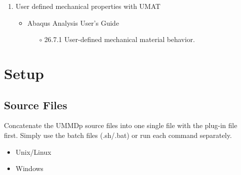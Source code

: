 \documentclass[11pt,a4paper,twoside,final,onecolumn,titlepage]{article}
\begin{document}
\begin{enumerate}
\begin{itemize}
\begin{itemize}
     	\end{itemize}
  	\end{itemize}
  	 \item User defined mechanical properties with UMAT
  	 \begin{itemize}
    	 \item Abaqus Analysis User's Guide
     	\begin{itemize}
     		\item[$\circ$] 26.7.1 User-defined mechanical material behavior.
     	\end{itemize}
  	\end{itemize}
\end{enumerate}

\newpage
\section{Setup}
\vspace{0.5cm}

\subsection{Source Files}
\vspace{0.2cm}

Concatenate the UMMDp source files into one single file with the plug-in file first. Simply use the batch files (.sh/.bat) or run each command separately.

\begin{itemize}
	\item Unix/Linux\\
	\par
	\texttt{}
\end{itemize}
\par\medskip
\begin{itemize}
	\item Windows\\
	\par
	\texttt{}
\end{itemize}
\end{document}
